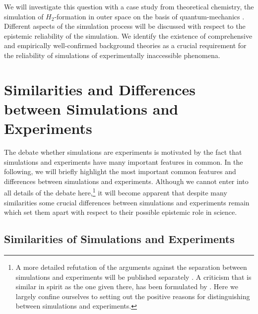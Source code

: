\documentclass[12pt, a4paper]{article}
\numberwithin{equation}{section}
\begin{document}
We will investigate this question with a case study from theoretical
chemistry, the simulation of $H_2$-formation in outer space on the basis
of quantum-mechanics \cite[]{goumans-kaestner:2010}.
 Different aspects of the simulation process
will be discussed with respect to the epistemic reliability of the
simulation. We identify the existence of comprehensive and empirically
well-confirmed background theories as a crucial requirement
for the reliability of simulations of experimentally inaccessible
phenomena.

\section{Similarities and Differences between Simulations and
Experiments}
\label{SimilaritiesAndDifferences}

The debate whether simulations are experiments is motivated by the
fact that simulations and experiments have many important features in
common.  In the following, we will briefly highlight the most
important common features and differences between simulations and
experiments.  Although we cannot enter into all details of the debate
here,\footnote{A more detailed refutation of the arguments against the
  separation between simulations and experiments will be published
  separately \citet{arnold:2013}. A criticism that is similar in
  spirit as the one given there, has been formulated by
  \citet{peschard:2011}. Here we largely confine ourselves to setting
  out the positive reasons for distinguishing between simulations and
  experiments.} it will become apparent that despite many similarities
some crucial differences between simulations and experiments remain
which set them apart with respect to their possible epistemic role in
science.

\subsection{Similarities of Simulations and Experiments}
\label{Similarities}
\end{document}
